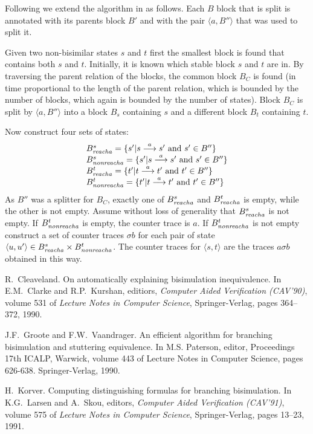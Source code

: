 \documentclass{article}
\newcommand{\pijl}[1]{\stackrel{#1}{\longrightarrow}}
\begin{document}
Following \cite{C90,K91} we extend the algorithm in \cite{GV90} as follows. 
Each $B$ block that is split is annotated with its parents block $B'$ and 
with the pair $\langle a,B''\rangle$ that was used to split it. 

Given two non-bisimilar states $s$ and $t$ first the smallest block is found
that contains both $s$ and $t$. Initially, it is known which stable block $s$ and
$t$ are in. By traversing the parent relation of the blocks, the common block $B_C$ is 
found (in time proportional to the length of the parent relation, which is bounded
by the number of blocks, which again is bounded by the number of states). Block
$B_C$ is split by $\langle a,B''\rangle$
into a block $B_s$ containing $s$ and a different block $B_t$ containing $t$.

Now construct four sets of states:
\[\begin{array}{l}
B^s_{\it reacha}=\{s'|s\pijl{a}s'~{\rm and}~s'\in B''\}\\
B^s_{\it nonreacha}=\{s'|s\pijl{a}s'~{\rm and}~s'\in B''\}\\
B^t_{\it reacha}=\{t'|t\pijl{a}t'~{\rm and}~t'\in B''\}\\
B^t_{\it nonreacha}=\{t'|t\pijl{a}t'~{\rm and}~t'\in B''\}
\end{array}\]
As $B''$ was a splitter for $B_C$, exactly one of $B^s_{\it reacha}$ and $B^t_{\it reacha}$ is
empty, while the other is not empty. Assume without loss of generality that $B^s_{\it reacha}$ is
not empty. If $B^t_{\it nonreacha}$ is empty, the counter trace is $a$. If $B^t_{\it nonreacha}$
is not empty construct a set of counter traces $\sigma b$ for each pair of state $\langle u,u'\rangle
\in B^s_{\it reacha}\times B^t_{\it nonreacha}$. The counter traces
for $\langle s,t\rangle$ are the traces $a\sigma b$ obtained in this way.

\begin{thebibliography}{10}
R.~Cleaveland. On automatically explaining bisimulation inequivalence.
In E.M.~Clarke and R.P.~Kurshan, editiors, {\it Computer Aided Verification (CAV'90)}, volume
531 of {\it Lecture Notes in Computer Science}, Springer-Verlag, pages 364--372, 1990.

J.F.~Groote and F.W.~Vaandrager. An efficient algorithm for branching bisimulation and stuttering equivalence. 
In M.S. Paterson, editor, Proceedings 17th ICALP, Warwick, volume 443 of Lecture Notes in Computer Science, 
pages 626-638. Springer-Verlag, 1990.

H.~Korver. Computing distinguishing formulas for branching bisimulation.
In K.G.~Larsen and A.~Skou, editors, {\it Computer Aided Verification (CAV'91)}, volume 575 of
{\it Lecture Notes in Computer Science}, Springer-Verlag, pages 13--23, 1991.

\end{thebibliography}
\end{document}
